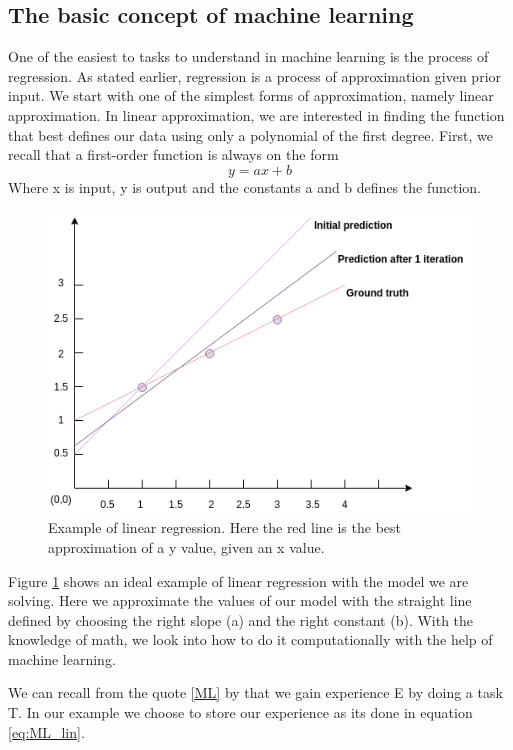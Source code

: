     
\subsection{The basic concept of machine learning}   
\label{cha:concept}
One of the easiest to tasks to understand in machine learning is the process of regression. As stated earlier, regression is a process of approximation given prior input.
We start with one of the simplest forms of approximation, namely linear approximation. In linear approximation, we are interested in finding the function that best defines our data using only a polynomial of the first degree.  First, we recall that a first-order function is always on the form
\begin{equation}
y = ax +b 
\end{equation}
Where x is input, y is output and the constants a and b defines the function.
    
\begin{figure}
\centering
\includegraphics[scale=0.7]{background/figures/regression.png}
\caption{Example of linear regression. Here the red line is the best approximation of a y value, given an x value.} 
\label{fig:regression_example}
\end{figure} 
Figure \ref{fig:regression_example} shows an ideal example of linear regression with the model we are solving. Here we approximate the values of our model with the straight line defined by choosing the right slope (a) and the right constant (b).
With the knowledge of math, we look into how to do it computationally with the help of machine learning. 


We can recall from the quote \ref{ML} by \cite{MitchellTomM1997Ml} that we gain experience E by doing a task T. In our example we choose to store our experience as its done in equation \ref{eq:ML_lin}.
    
